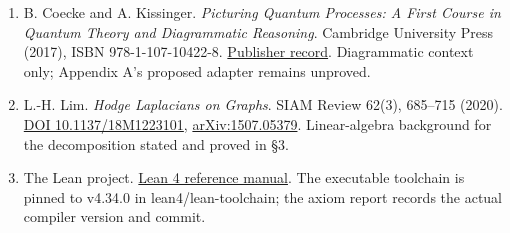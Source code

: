 \documentclass[
  11pt,
]{article}
\renewcommand{\_}{\ddcunderscore\allowbreak}
\begin{document}
\begin{enumerate}
  \href{https://ir.cwi.nl/pub/48}{CWI publication record},
  \href{https://doi.org/10.1016/S0304-3975(00)00056-6}{DOI
  10.1016/S0304-3975(00)00056-6}. Coalgebraic context for signatures and
  transition systems in Appendix C.2.
\item
  B. Coecke and A. Kissinger. \emph{Picturing Quantum Processes: A First
  Course in Quantum Theory and Diagrammatic Reasoning}. Cambridge
  University Press (2017), ISBN 978-1-107-10422-8.
  \href{https://www.cambridge.org/core/books/picturing-quantum-processes/1119568B3101F3A685BE832FEEC53E52}{Publisher
  record}. Diagrammatic context only; Appendix A's proposed adapter
  remains unproved.
\item
  L.-H. Lim. \emph{Hodge Laplacians on Graphs}. SIAM Review 62(3),
  685--715 (2020). \href{https://doi.org/10.1137/18M1223101}{DOI
  10.1137/18M1223101},
  \href{https://arxiv.org/abs/1507.05379}{arXiv:1507.05379}.
  Linear-algebra background for the decomposition stated and proved in
  §3.
\item
  The Lean project.
  \href{https://lean-lang.org/doc/reference/latest/}{Lean 4 reference
  manual}. The executable toolchain is pinned to v4.34.0 in
  lean4/lean-toolchain; the axiom report records the actual compiler
  version and commit.
\end{enumerate}
\end{document}
